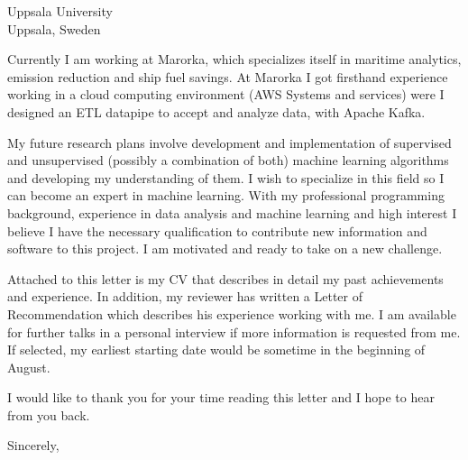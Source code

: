 \documentclass{letter}
\begin{document}
\begin{letter}{Uppsala University \\ Uppsala, Sweden}
\newpage

Currently I am working at Marorka, which specializes itself in maritime analytics, emission reduction and ship fuel savings. At Marorka I got firsthand experience working in a cloud computing environment (AWS Systems and services) were I designed an ETL datapipe to accept and analyze data, with Apache Kafka.

My future research plans involve development and implementation of supervised and unsupervised (possibly a combination of both) machine learning algorithms and developing my understanding of them. I wish to specialize in this field so I can become an expert in machine learning. With my professional programming background, experience in data analysis and machine learning and high interest I believe I have the necessary qualification to contribute new information and software to this project. I am motivated and ready to take on a new challenge.

Attached to this letter is my CV that describes in detail my past achievements and experience. In addition, my reviewer has written a Letter of Recommendation which describes his experience working with me. I am available for further talks in a personal interview if more information is requested from me. If selected, my earliest starting date would be sometime in the beginning of August. 

I would like to thank you for your time reading this letter and I hope to hear from you back.

\closing{Sincerely,}
\end{letter}
\end{document}
